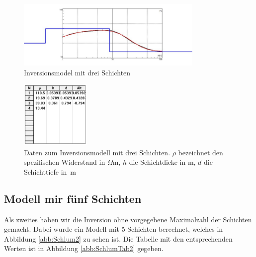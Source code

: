 \begin{figure}[ht]
\centering
\includegraphics[width=0.8\textwidth]{fig/Schlumberger_3Schichten.pdf}
\caption{Inversionsmodel mit drei Schichten }
\label{abb:Schlum1}
\end{figure}
\begin{figure}[ht]
\centering
\includegraphics[width=0.3\textwidth]{fig/schlumbergerTabelle.pdf}
\caption[Daten zum Inversionsmodell mit drei Schichten]{Daten zum Inversionsmodell mit drei Schichten. $\rho$ bezeichnet den spezifischen Widerstand in $\Omega$m, $h$ die Schichtdicke in m, $d$ die Schichttiefe in~m}
\label{abb:SchlumTab1}
\end{figure}

\subsection{Modell mir fünf Schichten}

Als zweites haben wir die Inversion ohne vorgegebene Maximalzahl der Schichten gemacht. Dabei wurde ein Modell mit 5 Schichten berechnet, welches in Abbildung \ref{abb:Schlum2} zu sehen ist. Die Tabelle mit den entsprechenden Werten ist in Abbildung \ref{abb:SchlumTab2} gegeben.

